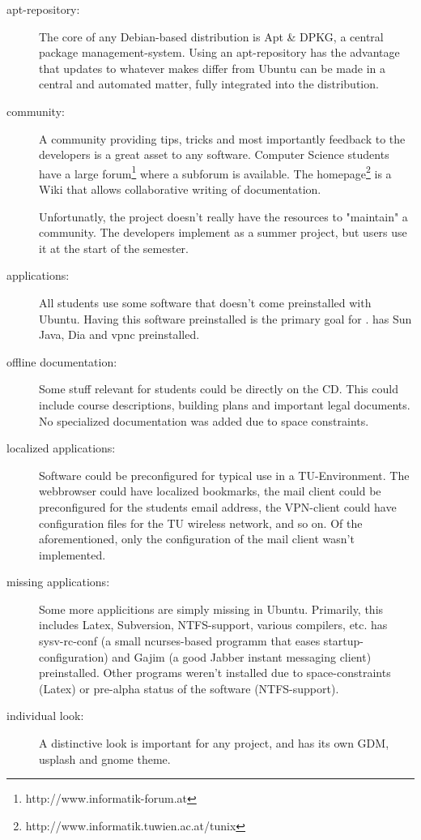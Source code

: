 \begin{description}
  \item[apt-repository:] The core of any Debian-based distribution is Apt \& DPKG,
    a central package management-system. Using an apt-repository has the
    advantage that updates to whatever makes \tunix{} differ from Ubuntu can be
    made in a central and automated matter, fully integrated into the
    distribution.
  \item[community:] A community providing tips, tricks and most importantly
    feedback to the developers is a great asset to any software. Computer
    Science students have a large forum\footnote{http://www.informatik-forum.at}
    where a \tunix{} subforum is available. The \tunix{}
    homepage\footnote{http://www.informatik.tuwien.ac.at/tunix} is a Wiki that
    allows collaborative writing of documentation. 

    Unfortunatly, the \tunix{} project doesn't really have the resources to
    "maintain" a community. The developers implement \tunix{} as a summer project,
    but users use it at the start of the semester. 
  \item[applications:] All students use some software that doesn't come
    preinstalled with Ubuntu. Having this software preinstalled is the
    primary goal for \tunix. \tunix{} has Sun Java, Dia and vpnc
    preinstalled.
  \item[offline documentation:] Some stuff relevant for students could be
    directly on the CD. This could include course descriptions, building
    plans and important legal
    documents. No specialized documentation was added due to space
    constraints.
  \item[localized applications:] Software could be preconfigured for typical
    use in a TU-Environment. The webbrowser could have localized bookmarks,
    the mail client could be preconfigured for the students email address,
    the VPN-client could have configuration files for the TU wireless
    network, and so on. Of the aforementioned, only the configuration of
    the mail client wasn't implemented.
  \item[missing applications:] Some more applicitions are simply missing in
    Ubuntu. Primarily, this includes Latex, Subversion, NTFS-support,
    various compilers, etc. \tunix{} has sysv-rc-conf (a small ncurses-based
    programm that eases startup-configuration) and Gajim (a good Jabber
    instant messaging client) preinstalled. Other programs weren't
    installed due to space-constraints (Latex) or pre-alpha status of the
    software (NTFS-support).
  \item[individual look:] A distinctive look is important for any project,
    and \tunix{} has its own GDM, usplash and gnome theme.
\end{description}
